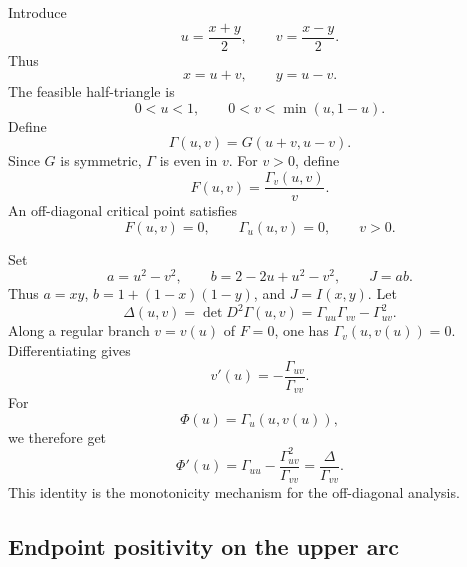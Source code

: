 Introduce
\begin{equation}\label{eq:uvdef}
  u=\frac{x+y}{2},
  \qquad
  v=\frac{x-y}{2}.
\end{equation}
Thus
\begin{equation}\label{eq:xy_uv}
  x=u+v,
  \qquad
  y=u-v.
\end{equation}
The feasible half-triangle is
\begin{equation}\label{eq:feasible_triangle}
  0<u<1,
  \qquad
  0<v<\min(u,1-u).
\end{equation}
Define
\begin{equation}\label{eq:Gamma_def}
  \Gamma(u,v)=G(u+v,u-v).
\end{equation}
Since \(G\) is symmetric, \(\Gamma\) is even in \(v\).  For \(v>0\), define
\begin{equation}\label{eq:Fdef}
  F(u,v)=\frac{\Gamma_v(u,v)}{v}.
\end{equation}
An off-diagonal critical point satisfies
\begin{equation}\label{eq:critical_conditions}
  F(u,v)=0,
  \qquad
  \Gamma_u(u,v)=0,
  \qquad
  v>0.
\end{equation}

Set
\begin{equation}\label{eq:abJ}
  a=u^2-v^2,
  \qquad
  b=2-2u+u^2-v^2,
  \qquad
  J=ab.
\end{equation}
Thus \(a=xy\), \(b=1+(1-x)(1-y)\), and \(J=I(x,y)\).  Let
\begin{equation}\label{eq:Delta_def}
  \Delta(u,v)=\det D^2\Gamma(u,v)=\Gamma_{uu}\Gamma_{vv}-\Gamma_{uv}^2.
\end{equation}
Along a regular branch \(v=v(u)\) of \(F=0\), one has \(\Gamma_v(u,v(u))=0\).  Differentiating gives
\begin{equation}\label{eq:vprime}
  v'(u)=-\frac{\Gamma_{uv}}{\Gamma_{vv}}.
\end{equation}
For
\begin{equation}\label{eq:Phi_def}
  \Phi(u)=\Gamma_u(u,v(u)),
\end{equation}
we therefore get
\begin{equation}\label{eq:schur}
  \Phi'(u)=\Gamma_{uu}-\frac{\Gamma_{uv}^2}{\Gamma_{vv}}=\frac{\Delta}{\Gamma_{vv}}.
\end{equation}
This identity is the monotonicity mechanism for the off-diagonal analysis.

\subsection{Endpoint positivity on the upper arc}

